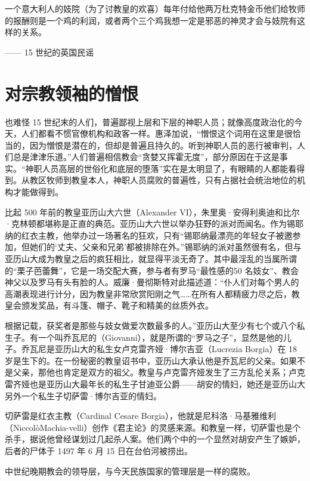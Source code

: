\begin{tcolorbox}
一个意大利人的妓院（为了讨教皇的欢喜）每年付给他两万杜克特金币他们给牧师的报酬则是一个鸡的利润，或者两个三个鸡我想一定是邪恶的神灵才会与妓院有这样的关系。
\begin{flushright}
—— 15 世纪的英国民谣
\end{flushright}
\end{tcolorbox}

\section{对宗教领袖的憎恨}
也难怪 15 世纪末的人们，普遍鄙视上层和下层的神职人员；就像高度政治化的今天，人们都看不惯官僚机构和政客一样。惠泽加说，“憎恨这个词用在这里是很恰当的，因为憎恨是潜在的，但却是普遍且持久的。听到神职人员的恶行被审判，人们总是津津乐道。”人们普遍相信教会“贪婪又挥霍无度”，部分原因在于这是事实。“神职人员高层的世俗化和底层的堕落”实在是太明显了，有眼睛的人都能看得到。从教区牧师到教皇本人，神职人员腐败的普遍性，只有占据社会统治地位的机构才能做得到。

比起 500 年前的教皇亚历山大六世（Alexander VI），朱里奥·安得利奥迪和比尔·克林顿都堪称是正直的典范。亚历山大六世以举办狂野的派对而闻名。作为锡耶纳的红衣主教，他举办过一场著名的狂欢，只有“锡耶纳最漂亮的年轻女子被邀参加，但她们的‘丈夫、父亲和兄弟’都被排除在外。”锡耶纳的派对虽然很有名，但与亚历山大成为教皇之后的疯狂相比，就显得平淡无奇了。其中最淫乱的当属所谓的“栗子芭蕾舞”，它是一场交配大赛，参与者有罗马“最性感的50 名妓女”、教会神父以及罗马有头有脸的人。威廉·曼彻斯特对此描述道：“仆人们对每个男人的高潮表现进行计分，因为教皇非常欣赏阳刚之气……在所有人都精疲力尽之后，教皇会颁发奖品，有斗篷、帽子、靴子和精美的丝质外衣。

根据记载，获奖者是那些与妓女做爱次数最多的人。”亚历山大至少有七个或八个私生子。有一个叫乔瓦尼的（Giovanni），就是所谓的“罗马之子”，显然是他的儿子。乔瓦尼是亚历山大的私生女卢克雷齐娅·博尔吉亚（Lucrezia Borgia）在 18 岁是生下的。在一份秘密的教皇诏书中，亚历山大承认他是乔瓦尼的父亲。如果不是父亲，那他也肯定是双方的祖父。教皇与卢克雷齐娅发生了三方乱伦关系；卢克雷齐娅也是亚历山大最年长的私生子甘迪亚公爵——胡安的情妇，她还是亚历山大另外一个私生子切萨雷·博尔吉亚的情妇。

切萨雷是红衣主教（Cardinal Cesare Borgia），他就是尼科洛·马基雅维利（NiccolòMachia-velli）创作《君主论》的灵感来源。和教皇一样，切萨雷也是个杀手，据说他曾经谋划过几起杀人案。他们两个中的一个显然对胡安产生了嫉妒，后者的尸体于 1497 年 6 月 15 日在台伯河被捞出。

中世纪晚期教会的领导层，与今天民族国家的管理层是一样的腐败。

